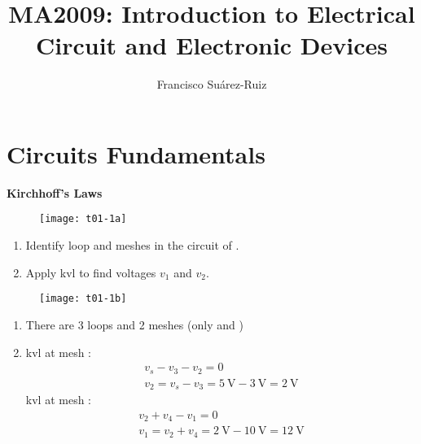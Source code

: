 \documentclass[10pt,a4paper]{memoir}
\title{MA2009: Introduction to Electrical Circuit and Electronic Devices}
\author{Francisco Su\'{a}rez-Ruiz}
\begin{document}
\maketitle

\chapter{Circuits Fundamentals}
\begin{question}
  \textbf{Kirchhoff's Laws}
  \begin{figure}[!h]
    \centering
    \texttt{[image: t01-1a]}
    \caption{}
    \label{fig:t01-1a}
  \end{figure}
  \begin{enumerate}
    \item Identify loop and meshes in the circuit of .
    \item Apply \ac{kvl} to find voltages $v_1$ and $v_2$.
  \end{enumerate}
\end{question}
\begin{solution}
  \begin{figure}[!h]
    \centering
    \texttt{[image: t01-1b]}
  \end{figure}
 \begin{enumerate}
    \item There are 3 loops and 2 meshes (only  and )
    \item \ac{kvl} at mesh :
    \begin{gather*}
      v_s - v_3 - v_2 = 0 \\
      v_2 = v_s - v_3 = \SI{5}{\volt} - \SI{3}{\volt} = \SI{2}{\volt}
    \end{gather*}
    \ac{kvl} at mesh :
    \begin{gather*}
      v_2 + v_4 - v_1 = 0 \\
      v_1 = v_2 + v_4  = \SI{2}{\volt} - \SI{10}{\volt} = \SI{12}{\volt}
    \end{gather*}
  \end{enumerate}
\end{solution}
\end{document}
